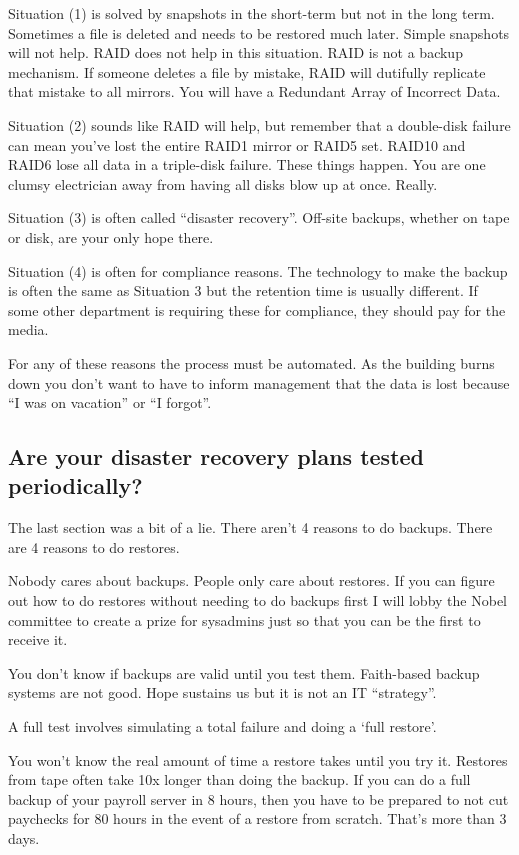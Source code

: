 \documentclass{article}
\begin{document}
Situation (1) is solved by snapshots in the short-term but not in the long term. Sometimes a file is deleted and needs to be restored much later. Simple snapshots will not help. RAID does not help in this situation. RAID is not a backup mechanism. If someone deletes a file by mistake, RAID will dutifully replicate that mistake to all mirrors. You will have a Redundant Array of Incorrect Data.

Situation (2) sounds like RAID will help, but remember that a double-disk failure can mean you've lost the entire RAID1 mirror or RAID5 set. RAID10 and RAID6 lose all data in a triple-disk failure. These things happen. You are one clumsy electrician away from having all disks blow up at once. Really.

Situation (3) is often called ``disaster recovery''. Off-site backups, whether on tape or disk, are your only hope there.

Situation (4) is often for compliance reasons. The technology to make the backup is often the same as Situation 3 but the retention time is usually different. If some other department is requiring these for compliance, they should pay for the media.

For any of these reasons the process must be automated. As the building burns down you don't want to have to inform management that the data is lost because ``I was on vacation'' or ``I forgot''. 

\subsection{Are your disaster recovery plans tested periodically?}
The last section was a bit of a lie. There aren't 4 reasons to do backups. There are 4 reasons to do restores.

Nobody cares about backups. People only care about restores. If you can figure out how to do restores without needing to do backups first I will lobby the Nobel committee to create a prize for sysadmins just so that you can be the first to receive it.

You don't know if backups are valid until you test them. Faith-based backup systems are not good. Hope sustains us but it is not an IT ``strategy''.

A full test involves simulating a total failure and doing a `full restore'.

You won't know the real amount of time a restore takes until you try it. Restores from tape often take 10x longer than doing the backup. If you can do a full backup of your payroll server in 8 hours, then you have to be prepared to not cut paychecks for 80 hours in the event of a restore from scratch. That's more than 3 days.
\end{document}
